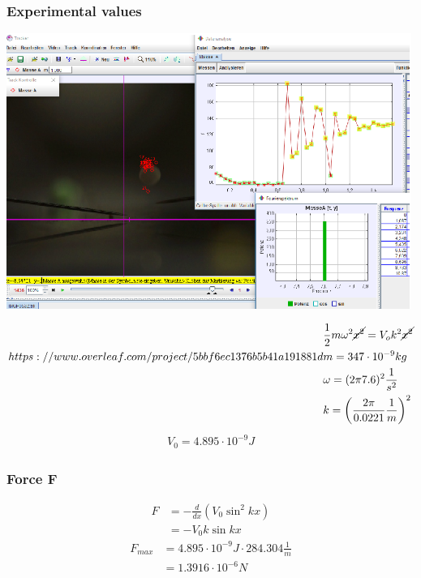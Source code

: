 \documentclass{beamer}
\begin{document}
\begin{frame}
\frametitle{Experimental values}
\begin{minipage}{0.595\textwidth}
\includegraphics[width=0.99\textwidth]{laengs}
\end{minipage}
\begin{minipage}{0.395\textwidth}
\begin{align*}
 &\frac{1}{2} m \omega^2 \cancel{x^2} = V_o k^2 \cancel{x^2} \\
https://www.overleaf.com/project/5bbf6ec1376b5b41a191881d &m=347\cdot 10^{-9}kg \\ &\omega=(2\pi 7.6)^2\frac{1}{s^2} \\ &k=\left(\frac{2\pi}{0.0221}\frac{1}{m}\right)^2
\end{align*}
\begin{align*}
V_0= 4.895\cdot 10^{-9} J
\end{align*}
\end{minipage}
\end{frame}

\begin{frame}
\frametitle{Force F}
\begin{align*}
 F &= -\frac{d}{dx}(V_0\sin^2kx)\\
   &= -V_0 k \sin kx
\end{align*}
\begin{align*}
 F_{max} &= 4.895\cdot 10^{-9}J \cdot 284.304\frac{1}{m}\\
         &= 1.3916 \cdot 10^{-6}N
\end{align*}
\end{frame}
\end{document}
